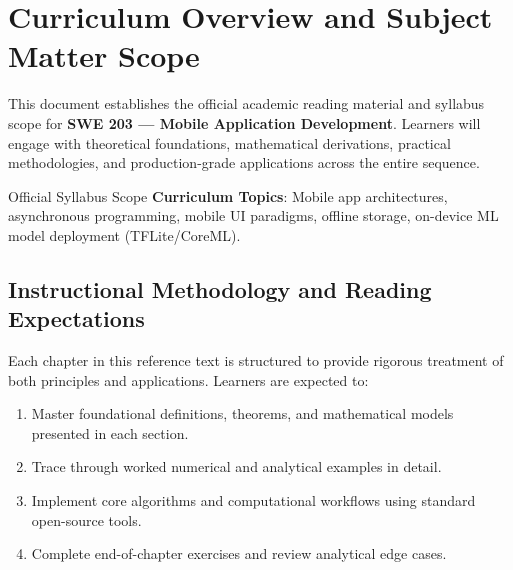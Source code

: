 \section{Curriculum Overview and Subject Matter Scope}

This document establishes the official academic reading material and syllabus scope for \textbf{SWE 203 --- Mobile Application Development}. Learners will engage with theoretical foundations, mathematical derivations, practical methodologies, and production-grade applications across the entire sequence.

\begin{InsightBox}{Official Syllabus Scope}
  \textbf{Curriculum Topics}: Mobile app architectures, asynchronous programming, mobile UI paradigms, offline storage, on-device ML model deployment (TFLite/CoreML).
\end{InsightBox}

\subsection{Instructional Methodology and Reading Expectations}

Each chapter in this reference text is structured to provide rigorous treatment of both principles and applications. Learners are expected to:
\begin{enumerate}
  \item Master foundational definitions, theorems, and mathematical models presented in each section.
  \item Trace through worked numerical and analytical examples in detail.
  \item Implement core algorithms and computational workflows using standard open-source tools.
  \item Complete end-of-chapter exercises and review analytical edge cases.
\end{enumerate}

